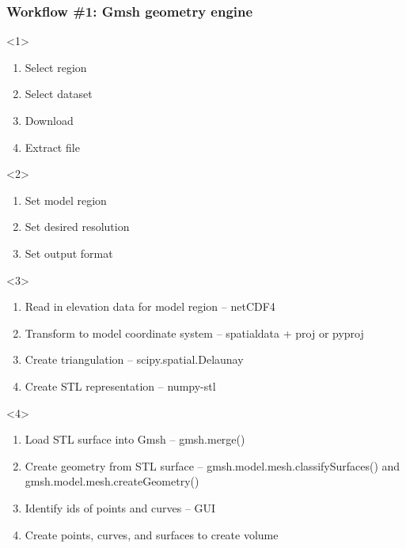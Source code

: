\documentclass[aspectratio=169]{beamer}
\begin{document}
\begin{frame}
  \frametitle{Workflow \#1: Gmsh geometry engine}

  \begin{enumerate}
    \begin{onlyenv}<1>
      \begin{enumerate}
      \item Select region
      \item Select dataset
      \item Download
      \item Extract file
      \end{enumerate}
    \end{onlyenv}
    \begin{onlyenv}<2>
      \begin{enumerate}
      \item Set model region
      \item Set desired resolution
      \item Set output format
      \end{enumerate}
    \end{onlyenv}
    \begin{onlyenv}<3>
      \begin{enumerate}
      \item Read in elevation data for model region -- {\ttfamily netCDF4}
      \item Transform to model coordinate system -- {\ttfamily spatialdata + proj} or {\ttfamily pyproj}
      \item Create triangulation -- {\ttfamily scipy.spatial.Delaunay}
      \item Create STL representation -- {\ttfamily numpy-stl}
      \end{enumerate}
    \end{onlyenv}
    \begin{onlyenv}<4>
      \begin{enumerate}
      \item Load STL surface into Gmsh -- {\ttfamily gmsh.merge()}
      \item Create geometry from STL surface -- {\ttfamily gmsh.model.mesh.classifySurfaces()} and {\ttfamily gmsh.model.mesh.createGeometry()}
      \item Identify ids of points and curves -- GUI
      \item Create points, curves, and surfaces to create volume
      \end{enumerate}
    \end{onlyenv}
  \end{enumerate}

\end{frame}
\end{document}
